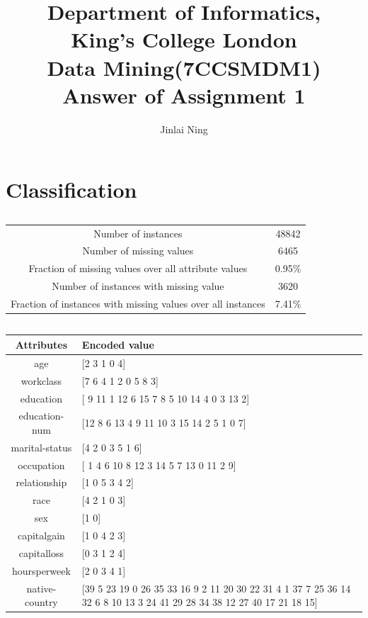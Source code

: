 \documentclass[12pt,a4paper]{report}
\title{Department of Informatics,\\ King's College London\\
Data Mining(7CCSMDM1)\\ Answer of Assignment 1}
\author{Jinlai Ning}
\begin{document}
\large
	\maketitle
	\section{Classification}
	\subsection{}
	\begin{tabular}{|c|c|}
	\hline
 	Number of instances&48842\\
  	Number of missing values&6465\\
  	Fraction of missing values over all attribute values&0.95\%\\
  	Number of instances with missing value&3620\\
  	Fraction of instances with missing values over all instances&7.41\%\\
	\hline
	\end{tabular}
	\subsection{}
	\begin{tabular}{|c|C{13cm}|}
	\hline
	Attributes&Encoded value\\
	\hline
  	age&[2 3 1 0 4]\\
	workclass&[7 6 4 1 2 0 5 8 3]\\
   	education&[ 9 11  1 12  6 15  7  8  5 10 14  4  0  3 13  2]\\
   	education-num&[12  8  6 13  4  9 11 10  3 15 14  2  5  1  0  7]\\
   	marital-status&[4 2 0 3 5 1 6]\\
   	occupation&[ 1  4  6 10  8 12  3 14  5  7 13  0 11  2  9]\\
   	relationship&[1 0 5 3 4 2]\\
   	race&[4 2 1 0 3]\\
   	sex&[1 0]\\
   	capitalgain&[1 0 4 2 3]\\
   	capitalloss&[0 3 1 2 4]\\
   	hoursperweek&[2 0 3 4 1]\\
   	native-country&[39  5 23 19  0 26 35 33 16  9  2 11 20 30 22 31  4  1 37  7 25 36 14 32
  6  8 10 13  3 24 41 29 28 34 38 12 27 40 17 21 18 15]\\
	\hline
	\end{tabular}
\end{document}
